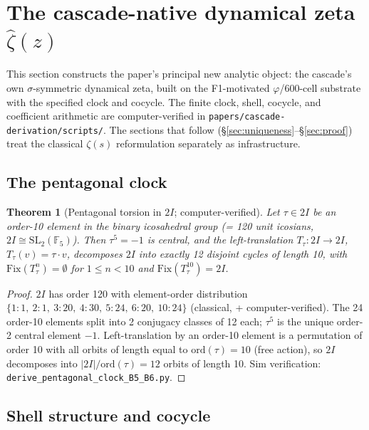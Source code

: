 \documentclass[11pt, a4paper]{amsart}
\newtheorem{theorem}{Theorem}[section]
\theoremstyle{definition}
\begin{document}
\section{The cascade-native dynamical zeta $\widehat\zeta(z)$}\label{sec:zhat}

This section constructs the paper's principal new analytic object:
the cascade's own $\sigma$-symmetric dynamical zeta, built on the
F1-motivated $\varphi$/600-cell substrate with the specified
clock and cocycle.  The finite clock, shell, cocycle, and
coefficient arithmetic are computer-verified in
\texttt{papers/cascade-derivation/scripts/}. The sections that
follow (\S\ref{sec:uniqueness}--\S\ref{sec:proof}) treat the
classical $\zeta(s)$ reformulation separately as infrastructure.

\subsection{The pentagonal clock}\label{subsec:clock}

\begin{theorem}[Pentagonal torsion in $2I$; computer-verified]\label{thm:pent_torsion}
Let $\tau \in 2I$ be an order-10 element in the binary icosahedral
group (= 120 unit icosians, $2I \cong \mathrm{SL}_2(\mathbb{F}_5)$).
Then $\tau^5 = -1$ is central, and the left-translation
$T_\tau: 2I \to 2I$, $T_\tau(v) = \tau \cdot v$, decomposes $2I$
into exactly 12 disjoint cycles of length 10, with
$\mathrm{Fix}(T_\tau^n) = \emptyset$ for $1 \leq n < 10$ and
$\mathrm{Fix}(T_\tau^{10}) = 2I$.
\end{theorem}

\begin{proof}
$2I$ has order 120 with element-order distribution
$\{1:1,\ 2:1,\ 3:20,\ 4:30,\ 5:24,\ 6:20,\ 10:24\}$ (classical, +
computer-verified). The 24 order-10 elements split into 2 conjugacy
classes of 12 each; $\tau^5$ is the unique order-2 central element
$-1$. Left-translation by an order-10 element is a permutation of
order 10 with all orbits of length equal to $\mathrm{ord}(\tau) = 10$
(free action), so $2I$ decomposes into $|2I| / \mathrm{ord}(\tau) =
12$ orbits of length 10. Sim verification:
\texttt{derive\_pentagonal\_clock\_B5\_B6.py}.
\end{proof}

\subsection{Shell structure and cocycle}\label{subsec:shell}
\end{document}

